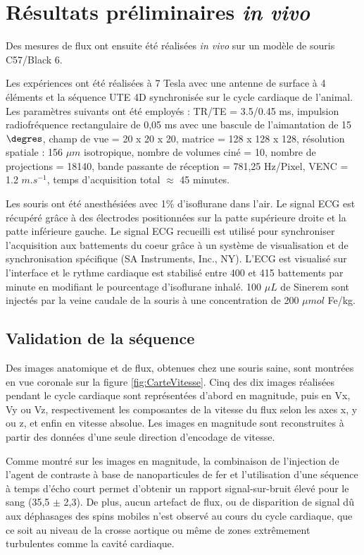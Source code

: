 \section{Résultats préliminaires \textit{in vivo}}

Des mesures de flux ont ensuite été réalisées \textit{in vivo} sur un modèle de souris C57/Black 6.

Les expériences ont été réalisées à 7 Tesla avec une antenne de surface à 4 éléments et la séquence UTE 4D synchronisée sur le cycle cardiaque de l’animal. Les  paramètres suivants ont été employés :
TR/TE = 3.5/0.45 ms, impulsion radiofréquence rectangulaire de 0,05 ms avec une bascule de l'aimantation de 15$\degres$, champ de vue = 20 x 20 x 20, matrice = 128 x 128 x 128, résolution spatiale : 156 $\mu m$ isotropique, nombre de volumes ciné = 10, nombre de projections  = 18140, bande passante de réception = 781,25 Hz/Pixel, VENC = 1.2 $m.s^{-1}$, temps d'acquisition total $\approx$ 45 minutes.

Les souris ont été anesthésiées avec 1$\%$ d'isoflurane dans l'air. Le signal ECG est récupéré grâce à des électrodes positionnées sur la patte supérieure droite et la patte inférieure gauche. Le signal ECG recueilli est utilisé pour synchroniser l'acquisition aux battements du coeur grâce à un système de visualisation et de synchronisation spécifique (SA Instruments, Inc., NY). L'ECG est visualisé sur l'interface et le rythme cardiaque est stabilisé entre 400 et 415 battements par minute en modifiant le pourcentage d'isoflurane inhalé. 100 $\mu L$ de Sinerem sont injectés par la veine caudale de la souris à une concentration de 200 $\mu mol$ Fe/kg.

\subsection{Validation de la séquence}

Des images anatomique et de flux, obtenues chez une souris saine, sont montrées en vue coronale sur la figure \ref{fig:CarteVitesse}. Cinq des dix images réalisées pendant le cycle cardiaque sont représentées d'abord en magnitude, puis en Vx, Vy ou Vz, respectivement les composantes de la vitesse du flux selon les axes x, y ou z, et enfin en vitesse absolue. Les images en magnitude sont reconstruites à partir des données d'une seule direction d'encodage de vitesse.

Comme montré sur les images en magnitude, la combinaison de l’injection de l’agent de contraste à base de nanoparticules de fer et l’utilisation d’une séquence à temps d’écho court permet d’obtenir un rapport signal-sur-bruit élevé pour le sang (35,5 $\pm$ 2,3). De plus, aucun artefact de flux, ou de disparition de signal dû aux déphasages des spins mobiles n’est observé au cours du cycle cardiaque, que ce soit au niveau de la crosse aortique ou même de zones extrêmement turbulentes comme la cavité cardiaque.

